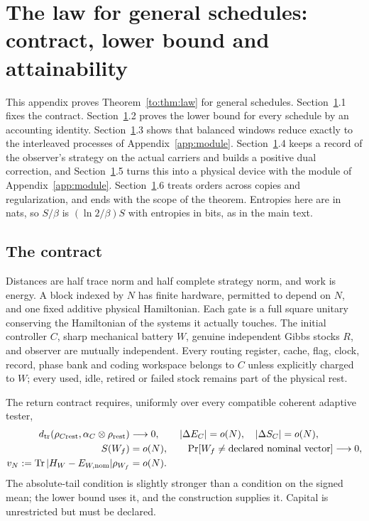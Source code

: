 \section{The law for general schedules: contract, lower bound and attainability}\label{to:app:schedules}\label{app:law}

This appendix proves Theorem~\ref{to:thm:law} for general schedules. Section~\ref{to:app:schedules}.1 fixes the contract. Section~\ref{to:app:schedules}.2 proves the lower bound for every schedule by an accounting identity. Section~\ref{to:app:schedules}.3 shows that balanced windows reduce exactly to the interleaved processes of Appendix~\ref{app:module}. Section~\ref{to:app:schedules}.4 keeps a record of the observer's strategy on the actual carriers and builds a positive dual correction, and Section~\ref{to:app:schedules}.5 turns this into a physical device with the module of Appendix~\ref{app:module}. Section~\ref{to:app:schedules}.6 treats orders across copies and regularization, and ends with the scope of the theorem. Entropies here are in nats, so $S/\beta$ is $(\ln2/\beta)S$ with entropies in bits, as in the main text.

\subsection{The contract}
Distances are half trace norm and half complete strategy norm, and work is energy. A block indexed by $N$ has finite hardware, permitted to depend on $N$, and one fixed additive physical Hamiltonian. Each gate is a full square unitary conserving the Hamiltonian of the systems it actually touches. The initial controller $C$, sharp mechanical battery $W$, genuine independent Gibbs stocks $R$, and observer are mutually independent. Every routing register, cache, flag, clock, record, phase bank and coding workspace belongs to $C$ unless explicitly charged to $W$; every used, idle, retired or failed stock remains part of the physical rest.

The return contract requires, uniformly over every compatible coherent adaptive tester,
\begin{align*}
d_{\rm tr}(\rho_{C\mathrm{rest}},\alpha_C\otimes\rho_{\mathrm{rest}})&\longrightarrow0,\qquad
|\Delta E_C|=o(N),\quad |\Delta S_C|=o(N),\\
S(W_f)&=o(N),\qquad
\Pr[W_f\ne\text{declared nominal vector}]\longrightarrow0,\\
v_N:=\operatorname{Tr}|H_W-E_{W,\mathrm{nom}}|\rho_{W_f}&=o(N).
\end{align*}
The absolute-tail condition is slightly stronger than a condition on the signed mean; the lower bound uses it, and the construction supplies it. Capital is unrestricted but must be declared.

